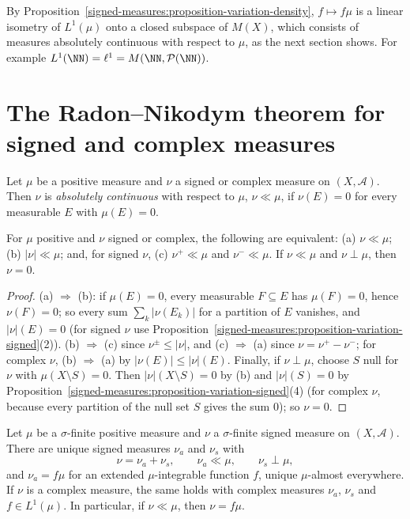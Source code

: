 By Proposition~\ref{signed-measures:proposition-variation-density}, $f \mapsto f\mu$ is a linear isometry of $L^1(\mu)$ onto a closed subspace of $M(X)$, which consists of measures absolutely
continuous with respect to $\mu$, as the next section shows. For example $L^1(\NN) = \ell^1 = M(\NN, \mathcal{P}(\NN))$.

\section{The Radon--Nikodym theorem for signed and complex measures}\label{signed-measures:section-radon-nikodym}

\begin{definition}\label{signed-measures:definition-absolutely-continuous}
Let $\mu$ be a positive measure and $\nu$ a signed or complex measure on $(X, \mathcal{A})$. Then $\nu$ is \emph{absolutely continuous} with respect to $\mu$, $\nu \ll \mu$, if $\nu(E) = 0$ for every
measurable $E$ with $\mu(E) = 0$.
\end{definition}

\begin{proposition}\label{signed-measures:proposition-absolutely-continuous}
For $\mu$ positive and $\nu$ signed or complex, the following are equivalent: (a) $\nu \ll \mu$; (b) $|\nu| \ll \mu$; and, for signed $\nu$, (c) $\nu^+ \ll \mu$ and $\nu^- \ll \mu$. If
$\nu \ll \mu$ and $\nu \perp \mu$, then $\nu = 0$.
\end{proposition}

\begin{proof}
(a) $\Rightarrow$ (b): if $\mu(E) = 0$, every measurable $F \subseteq E$ has $\mu(F) = 0$, hence $\nu(F) = 0$; so every sum $\sum_k|\nu(E_k)|$ for a partition of $E$ vanishes, and $|\nu|(E) = 0$ (for
signed $\nu$ use Proposition~\ref{signed-measures:proposition-variation-signed}(2)). (b) $\Rightarrow$ (c) since $\nu^\pm \leq |\nu|$, and (c) $\Rightarrow$ (a) since $\nu = \nu^+ - \nu^-$; for complex
$\nu$, (b) $\Rightarrow$ (a) by $|\nu(E)| \leq |\nu|(E)$. Finally, if $\nu \perp \mu$, choose $S$ null for $\nu$ with $\mu(X \setminus S) = 0$. Then $|\nu|(X \setminus S) = 0$ by (b) and
$|\nu|(S) = 0$ by Proposition~\ref{signed-measures:proposition-variation-signed}(4) (for complex $\nu$, because every partition of the null set $S$ gives the sum $0$); so $\nu = 0$.
\end{proof}

\begin{theorem}\label{signed-measures:theorem-lebesgue-radon-nikodym}
Let $\mu$ be a $\sigma$-finite positive measure and $\nu$ a $\sigma$-finite signed measure on $(X, \mathcal{A})$. There are unique signed measures $\nu_a$ and $\nu_s$ with
\[
\nu = \nu_a + \nu_s, \qquad \nu_a \ll \mu, \qquad \nu_s \perp \mu,
\]
and $\nu_a = f\mu$ for an extended $\mu$-integrable function $f$, unique $\mu$-almost everywhere. If $\nu$ is a complex measure, the same holds with complex measures $\nu_a$, $\nu_s$ and
$f \in L^1(\mu)$. In particular, if $\nu \ll \mu$, then $\nu = f\mu$.
\end{theorem}

